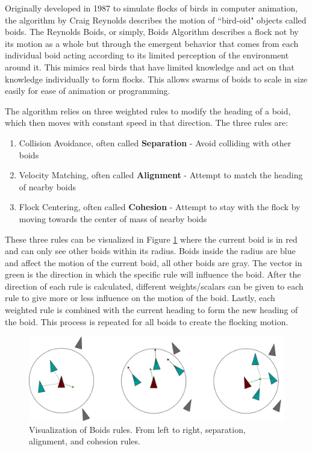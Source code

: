 Originally developed in 1987 to simulate flocks of birds in computer animation, the algorithm by Craig Reynolds \cite{reynolds1987flocks} describes the motion of ``bird-oid" objects called boids. The Reynolds Boids, or simply, Boids Algorithm describes a flock not by its motion as a whole but through the emergent behavior that comes from each individual boid acting according to its limited perception of the environment around it. This mimics real birds that have limited knowledge and act on that knowledge individually to form flocks. This allows swarms of boids to scale in size easily for ease of animation or programming.

The algorithm relies on three weighted rules to modify the heading of a boid, which then moves with constant speed in that direction. The three rules are: 

\begin{enumerate}
    \item Collision Avoidance, often called \textbf{Separation} - Avoid colliding with other boids
    \item Velocity Matching, often called \textbf{Alignment} - Attempt to match the heading of nearby boids
    \item Flock Centering, often called \textbf{Cohesion} - Attempt to stay with the flock by moving towards the center of mass of nearby boids
\end{enumerate}

These three rules can be visualized in Figure \ref{fig:boids_rules} where the current boid is in red and can only see other boids within its radius. Boids inside the radius are blue and affect the motion of the current boid, all other boids are gray. The vector in green is the direction in which the specific rule will influence the boid. After the direction of each rule is calculated, different weights/scalars can be given to each rule to give more or less influence on the motion of the boid. Lastly, each weighted rule is combined with the current heading to form the new heading of the boid. This process is repeated for all boids to create the flocking motion.

\begin{figure}[h]
    \centering
    \includegraphics[width=\textwidth]{Figures/boids_rules.png}
    \caption{Visualization of Boids rules. From left to right, separation, alignment, and cohesion rules.}
    \label{fig:boids_rules}
\end{figure}

